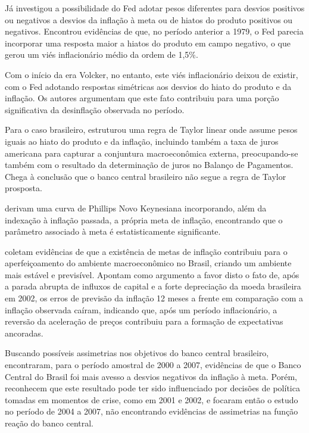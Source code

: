 \documentclass[
	article,			%
	11pt,				%
	oneside,			%
	a4paper,			%
	english,			%
	brazil,				%
	]{abntex2}
\begin{document}
	Já  investigou a possibilidade do Fed adotar pesos diferentes para desvios positivos ou negativos a desvios da inflação à meta ou de hiatos do produto positivos ou negativos. Encontrou evidências de que, no período anterior a 1979, o Fed parecia incorporar uma resposta maior a hiatos do produto em campo negativo, o que gerou um viés inflacionário médio da ordem de 1,5\%. 
	
	Com o início da era Volcker, no entanto, este viés inflacionário deixou de existir, com o Fed adotando respostas simétricas aos desvios do hiato do produto e da inflação. Os autores argumentam que este fato contribuiu para uma porção significativa da desinflação observada no período.
	
	Para o caso brasileiro,  estruturou uma regra de Taylor linear onde assume pesos iguais ao hiato do produto e da inflação, incluindo também a taxa de juros americana para capturar a conjuntura macroeconômica externa, preocupando-se também com o resultado da determinação de juros no Balanço de Pagamentos. Chega à conclusão que o banco central brasileiro não segue a regra de Taylor prosposta.
	
	 derivam uma curva de Phillips Novo Keynesiana incorporando, além da indexação à inflação passada, a própria meta de inflação, encontrando que o parâmetro associado à meta é estatisticamente significante.
	
	 coletam evidências de que a existência de metas de inflação contribuiu para o aperfeiçoamento do ambiente macroeconômico no Brasil, criando um ambiente mais estável e previsível. Apontam como argumento a favor disto o fato de, após a parada abrupta de influxos de capital e a forte depreciação da moeda brasileira em 2002, os erros de previsão da inflação 12 meses a frente em comparação com a inflação observada caíram, indicando que, após um período inflacionário, a reversão da aceleração de preços contribuiu para a formação de expectativas ancoradas.
	
	Buscando possíveis assimetrias nos objetivos do banco central brasileiro,  encontraram, para o período amostral de 2000 a 2007, evidências de que o Banco Central do Brasil foi mais avesso a desvios negativos da inflação à meta. Porém, reconhecem que este resultado pode ter sido influenciado por decisões de política tomadas em momentos de crise, como em 2001 e 2002, e focaram então o estudo no período de 2004 a 2007, não encontrando evidências de assimetrias na função reação do banco central.
	
\end{document}
